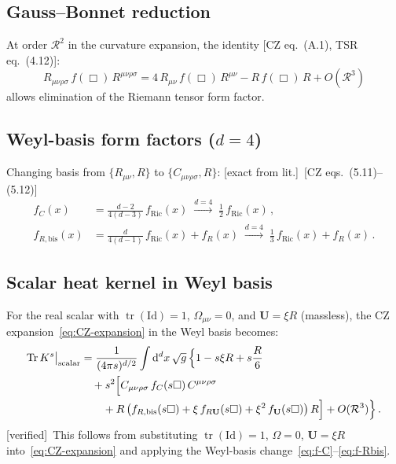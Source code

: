 \documentclass[12pt,a4paper]{article}
\theoremstyle{definition}
\theoremstyle{remark}
\newcommand{\Tr}{\operatorname{Tr}}
\newcommand{\tr}{\operatorname{tr}}
\newcommand{\dd}{\mathrm{d}}
\newcommand{\Id}{\mathrm{Id}}
\newcommand{\fromlit}[1]{\textcolor{blue!70!black}{\textsf{[#1]}}}
\newcommand{\exactlit}{\textcolor{blue!60!black}{\textsf{[exact from lit.]}}}
\newcommand{\verified}{\textcolor{green!50!black}{\textsf{[verified]}}}
\begin{document}
\subsection{Gauss--Bonnet reduction}

At order $\mathcal{R}^2$ in the curvature expansion, the identity
\fromlit{CZ eq.~(A.1), TSR eq.~(4.12)}:
\begin{equation}
  R_{\mu\nu\rho\sigma}\,f(\Box)\,R^{\mu\nu\rho\sigma}
  = 4\,R_{\mu\nu}\,f(\Box)\,R^{\mu\nu}
  - R\,f(\Box)\,R + O(\mathcal{R}^3)
  \label{eq:GB-reduction}
\end{equation}
allows elimination of the Riemann tensor form factor.

\subsection{Weyl-basis form factors ($d = 4$)}

Changing basis from $\{R_{\mu\nu}, R\}$ to $\{C_{\mu\nu\rho\sigma}, R\}$:
\exactlit\ \fromlit{CZ eqs.~(5.11)--(5.12)}
\begin{align}
  f_C(x) &= \frac{d-2}{4(d-3)}\,f_{\mathrm{Ric}}(x)
    \;\xrightarrow{d=4}\;
    \frac{1}{2}\,f_{\mathrm{Ric}}(x)\,,
  \label{eq:f-C}\\[4pt]
  f_{R,\mathrm{bis}}(x) &= \frac{d}{4(d-1)}\,f_{\mathrm{Ric}}(x) + f_R(x)
    \;\xrightarrow{d=4}\;
    \frac{1}{3}\,f_{\mathrm{Ric}}(x) + f_R(x)\,.
  \label{eq:f-Rbis}
\end{align}

\subsection{Scalar heat kernel in Weyl basis}

For the real scalar with $\tr(\Id) = 1$, $\Omega_{\mu\nu} = 0$,
and $\mathbf{U} = \xi R$ (massless), the CZ
expansion~\eqref{eq:CZ-expansion} in the Weyl basis becomes:
\begin{align}
  \Tr K^s\big|_{\mathrm{scalar}}
  &= \frac{1}{(4\pi s)^{d/2}}\int \dd^d x\,\sqrt{g}\,\Bigl\{
    1 - s\xi R + s\frac{R}{6}
  \nonumber\\
  &\quad + s^2\Bigl[
    C_{\mu\nu\rho\sigma}\,f_C(s\Box)\,C^{\mu\nu\rho\sigma}
  \nonumber\\
  &\quad\quad
    + R\,\bigl(f_{R,\mathrm{bis}}(s\Box)
    + \xi\,f_{R\mathbf{U}}(s\Box)
    + \xi^2\,f_{\mathbf{U}}(s\Box)\bigr)\,R
  \Bigr] + O(\mathcal{R}^3)\Bigr\}\,.
  \label{eq:scalar-HK}
\end{align}
\verified\ This follows from substituting $\tr(\Id)=1$, $\Omega=0$,
$\mathbf{U}=\xi R$ into~\eqref{eq:CZ-expansion} and applying
the Weyl-basis change~\eqref{eq:f-C}--\eqref{eq:f-Rbis}.
\end{document}
